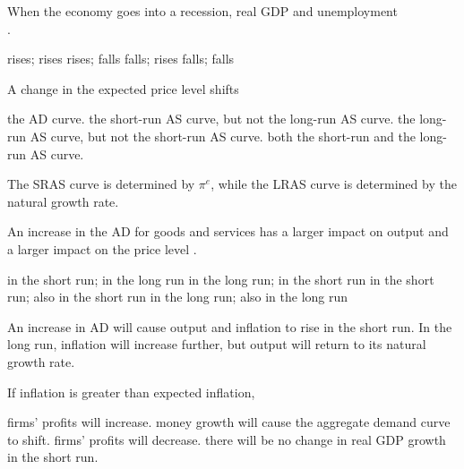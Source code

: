 \documentclass[addpoints,11pt]{exam}
\theoremstyle{definition}
\newcommand{\blank}[0]{\underline{\hspace{3cm}}}
\begin{document}
\begin{questions}


\question When the economy goes into a recession, real GDP \blank and unemployment \\ \blank.

\begin{choices}
	\choice rises; rises
	\choice rises; falls
	\CorrectChoice falls; rises
	\choice falls; falls
\end{choices}

\newpage

\question A change in the expected price level shifts 

\begin{choices}
	\choice the AD curve.
	\CorrectChoice the short-run AS curve, but not the long-run AS curve.
	\choice the long-run AS curve, but not the short-run AS curve. 
	\choice both the short-run and the long-run AS curve.
\end{choices}

\begin{solution}
	The SRAS curve is determined by $\pi^e$, while the LRAS curve is determined by the natural growth rate.
\end{solution}

\question An increase in the AD for goods and services has a larger impact on output  \blank  and a larger impact on the price level \blank.

\begin{choices}
	\CorrectChoice in the short run; in the long run
	\choice in the long run; in the short run
	\choice in the short run; also in the short run
	\choice in the long run; also in the long run
\end{choices}

\begin{solution}
	An increase in AD will cause output and inflation to rise in the short run. In the long run, inflation will increase further, but output will return to its natural growth rate.
\end{solution}

\question If inflation is greater than expected inflation, 

\begin{choices}
	\CorrectChoice firms' profits will increase.
	\choice money growth will cause the aggregate demand curve to shift.
	\choice firms' profits will decrease.
	\choice there will be no change in real GDP growth in the short run.
\end{choices}



\end{questions}
\end{document}
